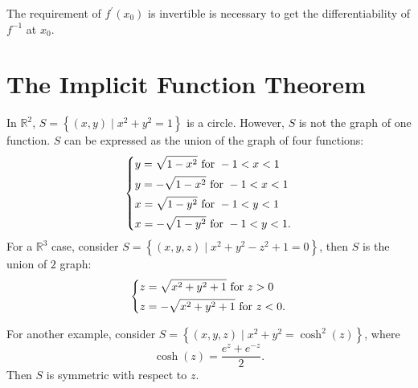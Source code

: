 \begin{remark}
    The requirement of \(f^{\prime} (x_0)\) is invertible is necessary to get the differentiability of \(f^{-1}\) at \(x_0\).  
\end{remark}

\section{The Implicit Function Theorem}
In \(\mathbb{R} ^2\), \(S = \left\{ (x, y) \mid x^2 + y^2 = 1 \right\} \) is a circle. However, \(S\) is not the graph of one function. \(S\) can be expressed as the union of the graph of four functions:
\[
    \begin{dcases}
        y = \sqrt{1 - x^2} \text{ for } -1 < x < 1 \\
        y = -\sqrt{1 - x^2} \text{ for } -1 < x < 1 \\
        x = \sqrt{1 - y^2} \text{ for } -1 < y < 1 \\
        x = - \sqrt{1 - y^2} \text{ for }  -1 < y < 1.       
    \end{dcases}
\]    
For a \(\mathbb{R} ^3\) case, consider \(S = \left\{ (x, y, z) \mid x^2 + y^2 - z^2 + 1 = 0 \right\} \), then \(S\) is the union of \(2\) graph:
\[
    \begin{dcases}
        z = \sqrt{x^2 + y^2 + 1} \text{ for } z > 0 \\
        z = -\sqrt{x^2 + y^2 + 1} \text{ for } z < 0.   
    \end{dcases}
\]   

\begin{center}
\end{center}

For another example, consider \(S = \left\{ (x, y, z) \mid x^2 + y^2 = \cosh^2(z) \right\} \), where 
\[
    \cosh(z) = \frac{e^z + e^{-z}}{2}.
\]
Then \(S\) is symmetric with respect to \(z\). 

